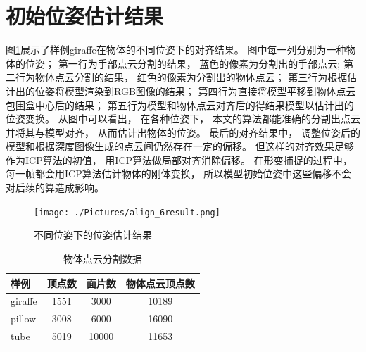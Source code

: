  \section{初始位姿估计结果}\label{sec_pose_est_res} 
 图\ref{align_result}展示了样例giraffe在物体的不同位姿下的对齐结果。
 图中每一列分别为一种物体的位姿；
 第一行为手部点云分割的结果，
 蓝色的像素为分割出的手部点云;
 第二行为物体点云分割的结果，
 红色的像素为分割出的物体点云；
 第三行为根据估计出的位姿将模型渲染到RGB图像的结果；
 第四行为直接将模型平移到物体点云包围盒中心后的结果；
 第五行为模型和物体点云对齐后的得结果模型以估计出的位姿变换。
 从图中可以看出，
 在各种位姿下，
 本文的算法都能准确的分割出点云并将其与模型对齐，
 从而估计出物体的位姿。
 最后的对齐结果中，
 调整位姿后的模型和根据深度图像生成的点云间仍然存在一定的偏移。
 但这样的对齐效果足够作为ICP算法的初值，
 用ICP算法做局部对齐消除偏移。
 在形变捕捉的过程中，
 每一帧都会用ICP算法估计物体的刚体变换，
 所以模型初始位姿中这些偏移不会对后续的算造成影响。
 \begin{figure}
    \centering
    \texttt{[image: ./Pictures/align\_6result.png]}
    \caption{不同位姿下的位姿估计结果}
    \label{align_result}
\end{figure}
\begin{table}
    \caption{物体点云分割数据}
    \label{tab_sample_data} 
    \centering
    \begin{tabular}[t]{|l|c|c|c|}
        \hline
        样例       &   顶点数   &   面片数   &  物体点云顶点数\\
        \hline
        giraffe     &   1551    &   3000    &   10189       \\
        \hline
        pillow      &   3008    &   6000    &   16090       \\
        \hline
        tube        &   5019    &   10000   &   11653       \\
        \hline
    \end{tabular}
\end{table}

